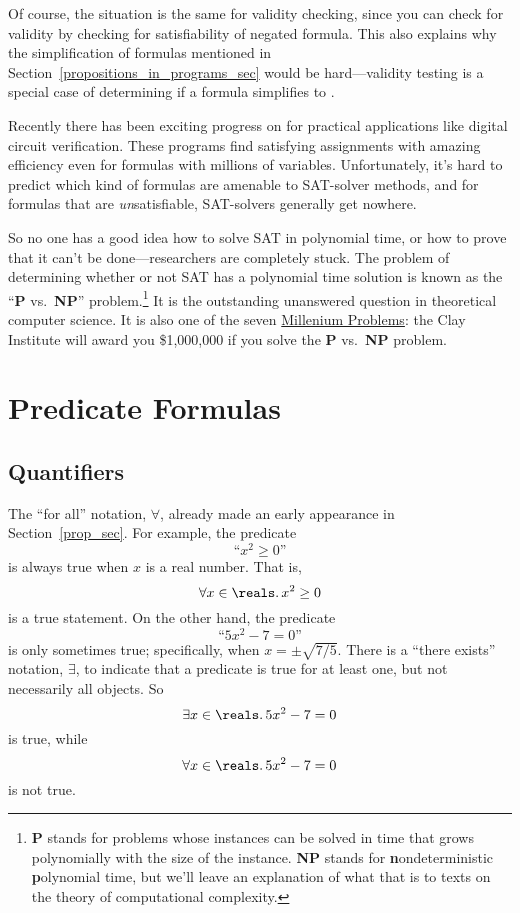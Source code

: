 Of course, the situation is the same for validity checking, since you
can check for validity by checking for satisfiability of negated
formula.  This also explains why the simplification of formulas
mentioned in Section~\ref{propositions_in_programs_sec} would be
hard---validity testing is a special case of determining if a formula
simplifies to \true.

Recently there has been exciting progress on  for
practical applications like digital circuit verification.  These
programs find satisfying assignments with amazing efficiency even for
formulas with millions of variables.  Unfortunately, it's hard to
predict which kind of formulas are amenable to SAT-solver methods, and
for formulas that are \emph{un}satisfiable, SAT-solvers generally get
nowhere.

So no one has a good idea how to solve SAT in polynomial time, or how
to prove that it can't be done---researchers are completely stuck.
The problem of determining whether or not SAT has a polynomial time
solution is known as the ``\textbf{P} vs.\, \textbf{NP}''
problem.\footnote{\textbf{P} stands for problems whose instances can
be solved in time that grows polynomially with the size of the
instance.  \textbf{NP} stands
for \textbf{n}ondeterministic \textbf{p}olynomial time, but we'll
leave an explanation of what that is to texts on the theory of
computational complexity.}  It is the outstanding unanswered question
in theoretical computer science.  It is also one of the
seven \href{http://www.claymath.org/millennium/}{Millenium Problems}:
the Clay Institute will award you \$1,000,000 if you solve
the \textbf{P} vs.\, \textbf{NP} problem.

\begin{problems}

\homeworkproblems
{}

\end{problems}

\section{Predicate Formulas}\label{predicate_sec}

\subsection{Quantifiers}\label{quantifier_sec}
The ``for all'' notation, $\forall$, already made an early appearance in
Section~\ref{prop_sec}.  For example, the predicate
%
\[
\text{``$x^2 \geq 0$''}
\]
%
is always true when $x$ is a real number.  That is,
\[
\forall x \in \reals.\, x^2 \geq 0
\]
is a true statement.  On the other hand, the predicate
%
\[
\text{``$5x^2 - 7 = 0$''}
\]
%
is only sometimes true; specifically, when $x = \pm \sqrt{7/5}$.
There is a ``there exists'' notation, $\exists$, to indicate that a
predicate is true for at least one, but not necessarily all objects.
So 
\[
\exists x \in \reals.\, 5x^2 - 7 = 0
\]
is true, while
\[
\forall x \in \reals.\, 5x^2 - 7 = 0
\]
is not true.

